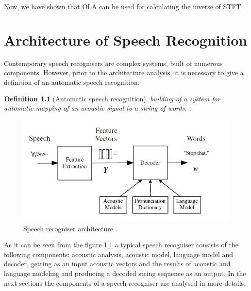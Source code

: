 \documentclass[11pt,a4paper]{report}
\newtheorem{definition}[theorem]{Definition}
\begin{document}
Now, we have shown that OLA can be used for calculating the inverse of STFT.

\chapter {Architecture of Speech Recognition}
\label {sec:architecture}

Contemporary speech recognisers are complex systems, built of
numerous components. However, prior to the architecture analysis, it is necessary to give
a definition of an automatic speech recognition. \begin {definition}[Automatic speech recognition] building of a
system for automatic mapping of an acoustic signal to a string of words. \citep
{jurafsky-martin-2009}.
\end{definition}
\begin  {figure}[h]
\begin {center}
     \includegraphics[height=6.0 cm]{arc2}
     \caption {Speech recogniser architecture \citep {Gales2008application}.}
     \label {fig:arc}
     \end {center}
     \end {figure}

As it can be seen from the figure \ref{fig:arc} a typical
speech recogniser consists of the following components: acoustic analysis, acoustic model,
language model and decoder, getting as an input acoustic vectors and the results
of acoustic and language modeling and producing a decoded string sequence as
an output.  In the next sections the components of a speech recogniser are
analysed in more details. 
\end{document}
